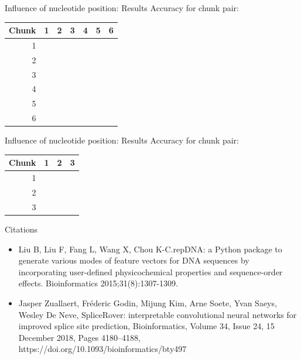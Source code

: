 \documentclass[10pt]{beamer}
\begin{document}
\begin{frame}{Influence of nucleotide position: Results}
	Accuracy for chunk pair:\\
	\vspace{0.3cm}
	\begingroup
	\centering
	\def\arraystretch{1.1}
	\begin{tabular}{|r|r|r|r|r|r|r|}
		\hline
		Chunk&1&2&3&4&5&6\\
		\hline
		1&&&&&&\\
		2&&&&&&\\
		3&&&&&&\\
		4&&&&&&\\
		5&&&&&&\\
		6&&&&&&\\
		
		\hline 
	\end{tabular}
	\endgroup
\end{frame}

\begin{frame}{Influence of nucleotide position: Results}
	Accuracy for chunk pair:\\
	\vspace{0.3cm}
	\begingroup
	\centering
	\def\arraystretch{1.1}
	\begin{tabular}{|r|r|r|r|}
		\hline
		Chunk&1&2&3\\
		\hline
		1&&&\\
		2&&&\\
		3&&&\\		
		\hline 
	\end{tabular}
	\endgroup
\end{frame}

\begin{frame}{Citations}
	\footnotesize
	\begin{itemize}
		\item Liu B, Liu F, Fang L, Wang X, Chou K-C.repDNA: a Python package to generate various modes of feature vectors for DNA sequences by incorporating user-defined physicochemical properties and sequence-order effects. Bioinformatics 2015;31(8):1307-1309.
		\item Jasper Zuallaert, Fréderic Godin, Mijung Kim, Arne Soete, Yvan Saeys, Wesley De Neve, SpliceRover: interpretable convolutional neural networks for improved splice site prediction, Bioinformatics, Volume 34, Issue 24, 15 December 2018, Pages 4180–4188, https://doi.org/10.1093/bioinformatics/bty497
	\end{itemize}
\end{frame}
\end{document}
